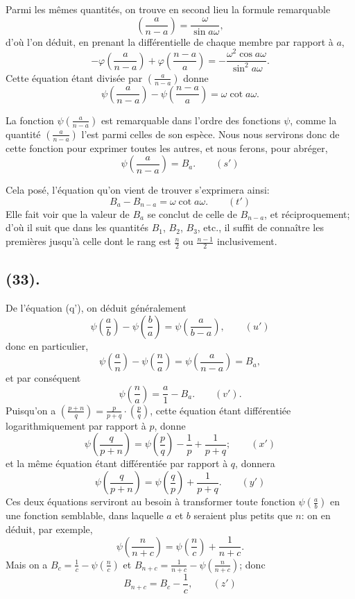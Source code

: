 \documentclass{article}
\begin{document}
Parmi les mêmes quantités, on trouve en second lieu la formule remarquable
\[ \left(\frac{a}{n-a}\right)=\frac{\omega}{\sin a\omega}, \]
d'où l'on déduit, en prenant la différentielle de chaque membre par rapport à $a$,
\[ -\varphi\left(\frac{a}{n-a}\right)+\varphi\left(\frac{n-a}{a}\right)=-\frac{\omega^{2}\cos a\omega}{\sin^{2}a\omega}. \]
Cette équation étant divisée par $\left(\frac{a}{n-a}\right)$ donne
\[ \psi\left(\frac{a}{n-a}\right)-\psi\left(\frac{n-a}{a}\right)=\omega\cot a\omega. \]

La fonction $\psi\left(\frac{a}{n-a}\right)$ est remarquable dans l'ordre des fonctions $\psi$, comme la quantité $\left(\frac{a}{n-a}\right)$ l'est parmi celles de son espèce. Nous nous servirons donc de cette fonction pour exprimer toutes les autres, et nous ferons, pour abréger,
\[ \psi\left(\frac{a}{n-a}\right)=B_{a}.\qquad(s') \]

Cela posé, l'équation qu'on vient de trouver s'exprimera ainsi:
\[ B_{a}-B_{n-a}=\omega\cot a\omega.\qquad(t') \]
Elle fait voir que la valeur de $B_{a}$ se conclut de celle de $B_{n-a}$, et réciproquement; d'où il suit que dans les quantités $B_{1}$, $B_{2}$, $B_{3}$, etc., il suffit de connaître les premières jusqu'à celle dont le rang est $\frac{n}{2}$ ou $\frac{n-1}{2}$ inclusivement.

\subsection*{(33).}

De l'équation (q'), on déduit généralement
\[ \psi\left(\frac{a}{b}\right)-\psi\left(\frac{b}{a}\right)=\psi\left(\frac{a}{b-a}\right),\qquad(u') \]
donc en particulier,
\[ \psi\left(\frac{a}{n}\right)-\psi\left(\frac{n}{a}\right)=\psi\left(\frac{a}{n-a}\right)=B_{a}, \]
et par conséquent
\[ \psi\left(\frac{n}{a}\right)=\frac{a}{1}-B_{a}.\qquad(v'). \]
Puisqu'on a $\left(\frac{p+n}{q}\right)=\frac{p}{p+q}\cdot\left(\frac{p}{q}\right)$, cette équation étant différentiée logarithmiquement par rapport à $p$, donne
\[ \psi\left(\frac{q}{p+n}\right)=\psi\left(\frac{p}{q}\right)-\frac{1}{p}+\frac{1}{p+q};\qquad(x') \]
et la même équation étant différentiée par rapport à $q$, donnera
\[ \psi\left(\frac{q}{p+n}\right)=\psi\left(\frac{q}{p}\right)+\frac{1}{p+q}.\qquad(y') \]
Ces deux équations serviront au besoin à transformer toute fonction $\psi\left(\frac{a}{b}\right)$ en une fonction semblable, dans laquelle $a$ et $b$ seraient plus petits que $n$: on en déduit, par exemple,
\[ \psi\left(\frac{n}{n+c}\right)=\psi\left(\frac{n}{c}\right)+\frac{1}{n+c}. \]
Mais on a $B_{c}=\frac{1}{c}-\psi\left(\frac{n}{c}\right)$ et $B_{n+c}=\frac{1}{n+c}-\psi\left(\frac{n}{n+c}\right)$; donc
\[ B_{n+c}=B_{c}-\frac{1}{c},\qquad(z') \]
\end{document}
